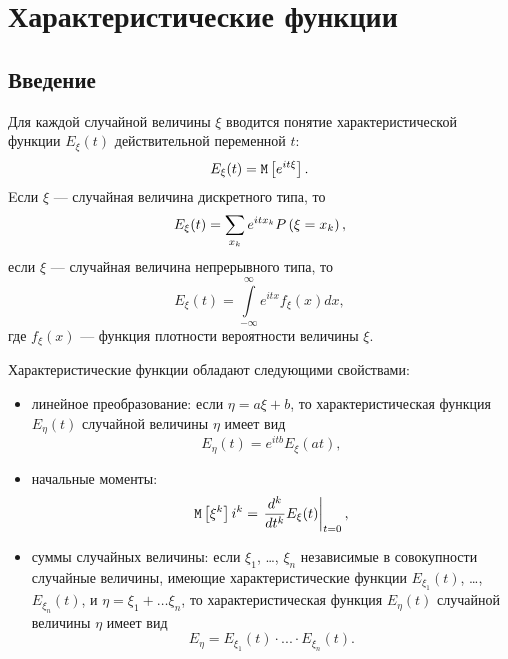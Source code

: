 \chapter{Характеристические функции}

\section*{Введение}

Для каждой случайной величины $\xi$ вводится понятие характеристической функции $E_\xi(t)$ действительной переменной $t$:
\begin{equation}
    E_\xi(t) = \mathtt{M} \left [ e^{i t \xi} \right ].
\end{equation}
Eсли $\xi$ --- случайная величина дискретного типа, то
\begin{equation}
    E_\xi(t) = \sum_{x_k} e^{i t x_k} P \left ( \xi = x_k \right ),
\end{equation}
если $\xi$ --- случайная величина непрерывного типа, то
\begin{equation}
    E_\xi(t) = \int \limits_{-\infty}^\infty e^{i t x} f_\xi(x) dx,
\end{equation}
где $f_\xi(x)$ --- функция плотности вероятности величины $\xi$.

Характеристические функции обладают следующими свойствами:
\begin{itemize}
    \item линейное преобразование: если $\eta = a \xi + b$, то характеристическая функция $E_\eta(t)$ случайной величины $\eta$ имеет вид
    \begin{equation}
        E_\eta(t) = e^{i t b} E_\xi(a t),
    \end{equation}
    \item начальные моменты:
    \begin{equation}
        \mathtt{M} \left [ \xi^k \right ] i^k = \left . \frac{d^{k}}{d{t}^{k}} E_\xi(t) \right |_{t=0} ,
    \end{equation}
    \item суммы случайных величины: если $\xi_1$, \dots, $\xi_n$ независимые в совокупности случайные величины, имеющие характеристические функции $E_{\xi_1}(t)$, \dots,
    $E_{\xi_n}(t)$, и $\eta = \xi_1 + \dots \xi_n$, то характеристическая функция $E_\eta(t)$ случайной величины $\eta$ имеет вид
    \begin{equation}
        E_\eta = E_{\xi_1}(t) \cdot ... \cdot E_{\xi_n}(t) .
    \end{equation}
\end{itemize}

